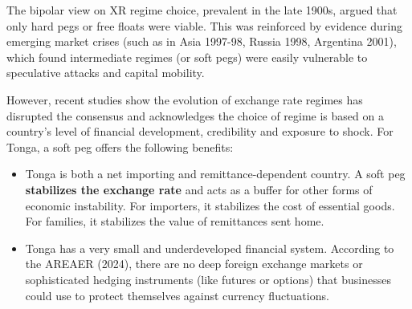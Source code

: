 \documentclass[12pt]{article}
\begin{document}




\noindent The bipolar view on XR regime choice, prevalent in the late 1900s, argued that only hard pegs or free floats were viable. This was reinforced by evidence during emerging market crises (such as in Asia 1997-98, Russia 1998, Argentina 2001), which found intermediate regimes (or soft pegs) were easily vulnerable to speculative attacks and capital mobility.


\noindent However, recent studies show the evolution of exchange rate regimes has disrupted the consensus and acknowledges the choice of regime is based on a country's level of financial development, credibility and exposure to shock. For Tonga, a soft peg offers the following benefits:

\begin{itemize}
    \item  Tonga is both a net importing and remittance-dependent country. A soft peg \textbf{stabilizes the exchange rate} and acts as a buffer for other forms of economic instability. For importers, it stabilizes the cost of essential goods. For families, it stabilizes the value of remittances sent home.

    \item Tonga has a very small and underdeveloped financial system. According to the AREAER (2024), there are no deep foreign exchange markets or sophisticated hedging instruments (like futures or options) that businesses could use to protect themselves against currency fluctuations. 
\end{itemize}
\end{document}
